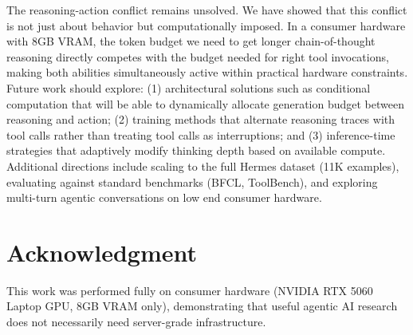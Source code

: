 \documentclass[conference]{IEEEtran}
\begin{document}
The reasoning-action conflict remains unsolved. We have showed that this conflict is not just about behavior but computationally imposed. In a consumer hardware with 8GB VRAM, the token budget we need to get longer chain-of-thought reasoning directly competes with the budget needed for right tool invocations, making both abilities simultaneously active within practical hardware constraints. Future work should explore: (1) architectural solutions such as conditional computation that will be able to dynamically allocate generation budget between reasoning and action; (2) training methods that alternate reasoning traces with tool calls rather than treating tool calls as interruptions; and (3) inference-time strategies that adaptively modify thinking depth based on available compute. Additional directions include scaling to the full Hermes dataset (11K examples), evaluating against standard benchmarks (BFCL, ToolBench), and exploring multi-turn agentic conversations on low end consumer hardware.

\section*{Acknowledgment}

This work was performed fully on consumer hardware (NVIDIA RTX 5060 Laptop GPU, 8GB VRAM only), demonstrating that useful agentic AI research does not necessarily need server-grade infrastructure.
\end{document}
